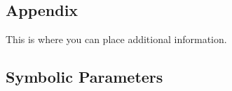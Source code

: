 \documentclass[12pt, titlepage]{article}
\begin{document}
\begin{enumerate}
\begin{comment}
\subsubsection{Module ?}
		
\begin{enumerate}

\item{test-id1\\}

Type: \wss{Functional, Dynamic, Manual, Automatic, Static etc. Most will
  be automatic}
					
Initial State: 
					
Input/Condition: 
					
Output/Result: 
					
How test will be performed: 
					
\item{test-id2\\}

Type: Functional, Dynamic, Manual, Static etc.
					
Initial State: 
					
Input: 
					
Output: 
					
How test will be performed: 

\end{enumerate}

\subsubsection{Module ?}

...

\subsection{Traceability Between Test Cases and Modules}

\wss{Provide evidence that all of the modules have been considered.}

\printbibliography

\end{comment}

\newpage

\section{Appendix}

This is where you can place additional information.

\subsection{Symbolic Parameters}


\end{enumerate}
\end{document}
